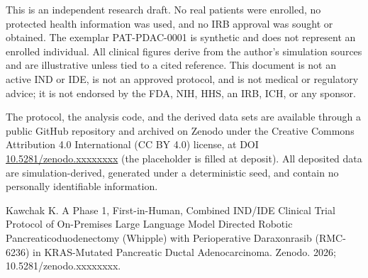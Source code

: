 This is an independent research draft. No real patients were enrolled, no protected
health information was used, and no IRB approval was sought or obtained. The
exemplar PAT-PDAC-0001 is synthetic and does not represent an enrolled individual.
All clinical figures derive from the author's simulation sources and are
illustrative unless tied to a cited reference. This document is not an active IND
or IDE, is not an approved protocol, and is not medical or regulatory advice; it is
not endorsed by the FDA, NIH, HHS, an IRB, ICH, or any sponsor.

The protocol, the analysis code, and the derived data sets are available through a
public GitHub repository and archived on Zenodo under the Creative Commons
Attribution 4.0 International (CC BY 4.0) license, at DOI
\href{https://doi.org/10.5281/zenodo.xxxxxxxx}{10.5281/zenodo.xxxxxxxx} (the
placeholder is filled at deposit). All deposited data are simulation-derived,
generated under a deterministic seed, and contain no personally identifiable
information.

Kawchak K. A Phase 1, First-in-Human, Combined IND/IDE Clinical Trial Protocol of
On-Premises Large Language Model Directed Robotic Pancreaticoduodenectomy (Whipple)
with Perioperative Daraxonrasib (RMC-6236) in KRAS-Mutated Pancreatic Ductal
Adenocarcinoma. Zenodo. 2026; 10.5281/zenodo.xxxxxxxx.

\begingroup\raggedright\nocite{*}\endgroup
